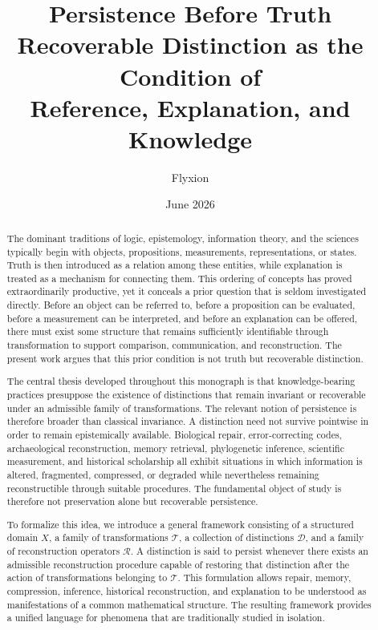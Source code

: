 \documentclass[12pt,oneside]{article}
\title{
{\Huge\bfseries
Persistence Before Truth}\\[1.5em]
{\Large
Recoverable Distinction as the Condition of\\
Reference, Explanation, and Knowledge}
}
\author{Flyxion}
\date{June 2026}
\theoremstyle{definition}
\begin{document}
\maketitle

\begin{abstract}

The dominant traditions of logic, epistemology, information theory, and the sciences typically begin with objects, propositions, measurements, representations, or states. Truth is then introduced as a relation among these entities, while explanation is treated as a mechanism for connecting them. This ordering of concepts has proved extraordinarily productive, yet it conceals a prior question that is seldom investigated directly. Before an object can be referred to, before a proposition can be evaluated, before a measurement can be interpreted, and before an explanation can be offered, there must exist some structure that remains sufficiently identifiable through transformation to support comparison, communication, and reconstruction. The present work argues that this prior condition is not truth but recoverable distinction.

The central thesis developed throughout this monograph is that knowledge-bearing practices presuppose the existence of distinctions that remain invariant or recoverable under an admissible family of transformations. The relevant notion of persistence is therefore broader than classical invariance. A distinction need not survive pointwise in order to remain epistemically available. Biological repair, error-correcting codes, archaeological reconstruction, memory retrieval, phylogenetic inference, scientific measurement, and historical scholarship all exhibit situations in which information is altered, fragmented, compressed, or degraded while nevertheless remaining reconstructible through suitable procedures. The fundamental object of study is therefore not preservation alone but recoverable persistence.

To formalize this idea, we introduce a general framework consisting of a structured domain \(X\), a family of transformations \(\mathcal{T}\), a collection of distinctions \(\mathcal{D}\), and a family of reconstruction operators \(\mathcal{R}\). A distinction is said to persist whenever there exists an admissible reconstruction procedure capable of restoring that distinction after the action of transformations belonging to \(\mathcal{T}\). This formulation allows repair, memory, compression, inference, historical reconstruction, and explanation to be understood as manifestations of a common mathematical structure. The resulting framework provides a unified language for phenomena that are traditionally studied in isolation.


\end{abstract}
\end{document}
